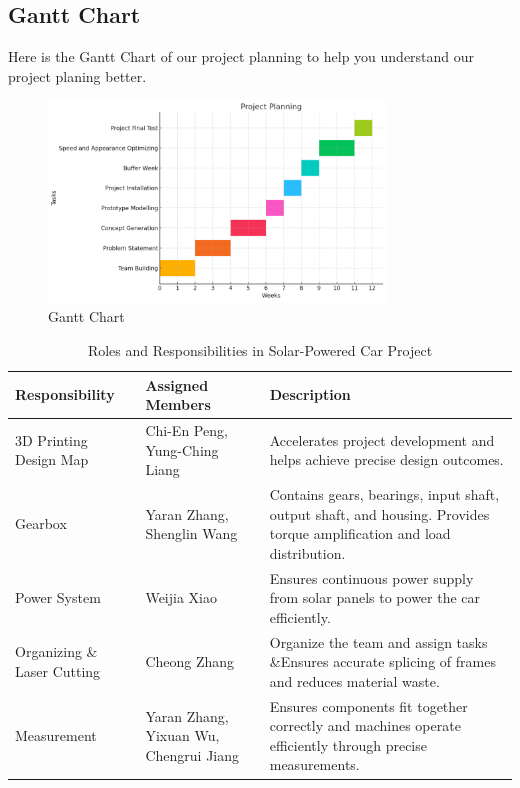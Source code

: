 \documentclass[12pt]{article}
\begin{document}
\subsection{Gantt Chart}
Here is the Gantt Chart of our project planning to help you understand our project planing better. 
\begin{figure}[h] 
    \centering 
    \includegraphics[width=0.8\textwidth]{figure/Picture1.png} 
    \caption{Gantt Chart} 
\end{figure}

\begin{table}[h!]
    \centering
    \begin{tabular}{|>{\raggedright\arraybackslash}p{3cm}|>{\raggedright\arraybackslash}p{4.5cm}|>{\raggedright\arraybackslash}p{6cm}|}
        \hline
        \textbf{Responsibility} & \textbf{Assigned Members} & \textbf{Description} \\ 
        \hline
        3D Printing Design Map & Chi-En Peng, Yung-Ching Liang & 
        Accelerates project development and helps achieve precise design outcomes. \\ 
        \hline
        Gearbox & Yaran Zhang, Shenglin Wang & 
        Contains gears, bearings, input shaft, output shaft, and housing. Provides torque amplification and load distribution. \\ 
        \hline
        Power System & Weijia Xiao & 
        Ensures continuous power supply from solar panels to power the car efficiently. \\ 
        \hline
        Organizing  \& Laser Cutting  & Cheong Zhang & 
        Organize the team and assign tasks \&Ensures accurate splicing of frames and reduces material waste. \\ 
        \hline
        Measurement & Yaran Zhang, Yixuan Wu, Chengrui Jiang & 
        Ensures components fit together correctly and machines operate efficiently through precise measurements. \\ 
        \hline
    \end{tabular}
    \caption{Roles and Responsibilities in Solar-Powered Car Project}
\end{table}
\end{document}
